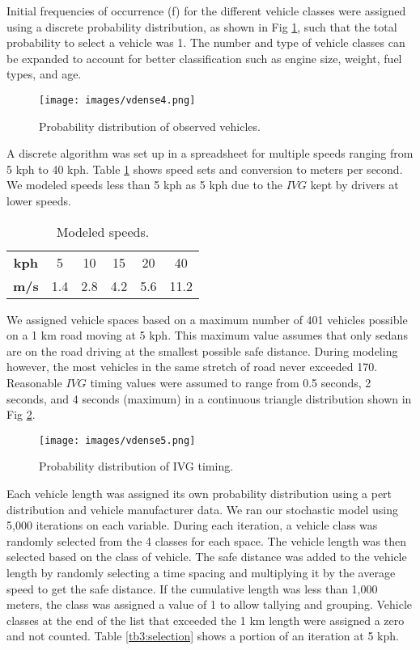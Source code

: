 Initial frequencies of occurrence (f) for the different vehicle classes were assigned using a discrete probability distribution, as shown in Fig \ref{fig4:vehobs}, such that the total probability to select a vehicle was 1.  The number and type of vehicle classes can be expanded to account for better classification such as engine size, weight, fuel types, and age.
 
%
\begin{figure}
\texttt{[image: images/vdense4.png]} 
\caption{Probability distribution of observed vehicles.}
\label{fig4:vehobs}
\end{figure}
%

A discrete algorithm was set up in a spreadsheet for multiple speeds ranging from 5 kph to 40 kph.  Table \ref{tb2:modelspeeds} shows speed sets and conversion to meters per second.  We modeled speeds less than 5 kph as 5 kph due to the $IVG$ kept by drivers at lower speeds.

\begin{table}[]
\centering
\caption{Modeled speeds.}
\label{tb2:modelspeeds}
\begin{tabular}{cccccc}
\textbf{kph} & 5   & 10  & 15  & 20  & 40   \\
\textbf{m/s} & 1.4 & 2.8 & 4.2 & 5.6 & 11.2
\end{tabular}
\end{table}

We assigned vehicle spaces based on a maximum number of 401 vehicles possible on a 1 km road moving at 5 kph.  This maximum value assumes that only sedans are on the road driving at the smallest possible safe distance.  During modeling however, the most vehicles in the same stretch of road never exceeded 170.  Reasonable $IVG$ timing values were assumed to range from 0.5 seconds, 2 seconds, and 4 seconds (maximum) in a continuous triangle distribution shown in Fig \ref{fig5:IVGobs}.
 
%
\begin{figure}
\texttt{[image: images/vdense5.png]} 
\caption{Probability distribution of IVG timing.}
\label{fig5:IVGobs}
\end{figure}
%

Each vehicle length was assigned its own probability distribution using a pert distribution and vehicle manufacturer data.  We ran our stochastic model using 5,000 iterations on each variable. 
During each iteration, a vehicle class was randomly selected from the 4 classes for each space.  The vehicle length was then selected based on the class of vehicle.  The safe distance was added to the vehicle length by randomly selecting a time spacing and multiplying it by the average speed to get the safe distance.  If the cumulative length was less than 1,000 meters, the class was assigned a value of 1 to allow tallying and grouping.  Vehicle classes at the end of the list that exceeded the 1 km length were assigned a zero and not counted.  Table \ref{tb3:selection} shows a portion of an iteration at 5 kph. 

